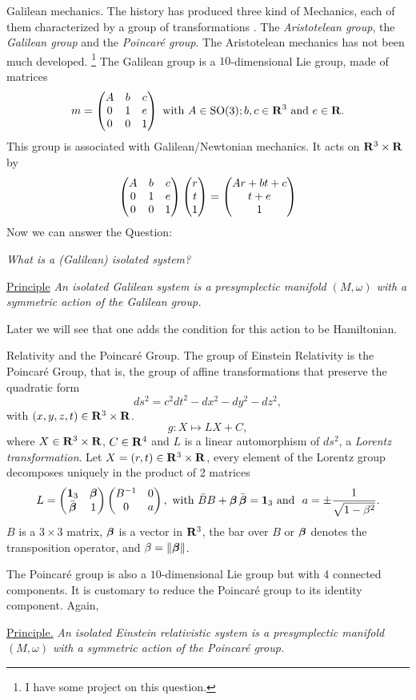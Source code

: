 \begin{Article}{Galilean mechanics.}{}
  The history has produced three kind of Mechanics,
  each of them characterized by a group of transformations \cite{PIZ18}.
  The \emph{Aristotelean group},
  the \emph{Galilean group} and the \emph{Poincaré group}.
  The Aristotelean mechanics has not been much developed.%
  \footnote{I have some project on this question.}
  The Galilean group is a $10$-dimensional Lie group,
  made of matrices
  $$%
    m = \Vector{A & b & c \\ 0 & 1 & e \\ 0 & 0 & 1}
    \SpacedText{with} A \in \SO(3); b,c \in \RR^3 \text{ and } e \in \RR.
    $$%
  This group is associated with Galilean/Newtonian mechanics.
  It acts on $\mathbf{R}^3 \times \mathbf{R}$ by
  $$%
    \Vector{A & b & c \\ 0 & 1 & e \\ 0 & 0 & 1}\Vector{r \\ t \\ 1} = \Vector{Ar + bt + c \\ t +e \\ 1}
    $$%
  Now we can answer the Question:
  
  \emph{What is a (Galilean) isolated system?}
  
  \uline{Principle} {\itshape An isolated Galilean system is a presymplectic manifold $(M,\omega)$ with a symmetric action of the Galilean group.}
  
  Later we will see that one adds the condition for this action to be Hamiltonian.
\end{Article}

\begin{Article}{Relativity and the Poincaré Group.}{}
  The group of Einstein Relativity is the Poincaré Group,
  that is,
  the group of affine transformations that preserve the quadratic form
  $$%
    ds^2 = c^2 dt^2 - dx^2 - dy^2 -dz^2,
    $$%
  with $(x,y,z,t) \in \mathbf{R}^3 \times \mathbf{R}$.
  $$%
    g : X \mapsto  LX + C,
    $$%
  where $X \in \mathbf{R}^3 \times \mathbf{R}$,
  $C \in \mathbf{R}^4$ and $L$ is a linear automorphism of $ds^2$,
  a \emph{Lorentz transformation}.
  Let $X = (r,t) \in \mathbf{R}^3 \times \mathbf{R}$,
  every element of the Lorentz group decomposes uniquely in the product of 2 matrices
  $$%
    L= \Vector{\Id_3 & \bbeta \\ \bar \bbeta & 1}
    \Vector{B^{-1} & 0 \\ 0 & a},
    \text{ with } \bar B B + \bbeta \, \bar \bbeta = \Id_3
    \text{ and } \ a = \pm {1 \over \sqrt{1-\beta^2}}.
    $$%
  $B$ is a $3\times 3$ matrix,
  $\boldsymbol \beta$ is a vector in $\mathbf{R}^3$,
  the bar over $B$ or $\boldsymbol \beta$ denotes the transposition operator,
  and $\beta = \Vert \boldsymbol \beta \Vert$.
  
  The Poincaré group is also a $10$-dimensional Lie group but with 4 connected components.
  It is customary to reduce the Poincaré group to its identity component.
  Again,
  
  \uline{Principle.} {\itshape An isolated Einstein relativistic system is a presymplectic manifold $(M,\omega)$ with a symmetric action of the Poincaré group.}
\end{Article}

